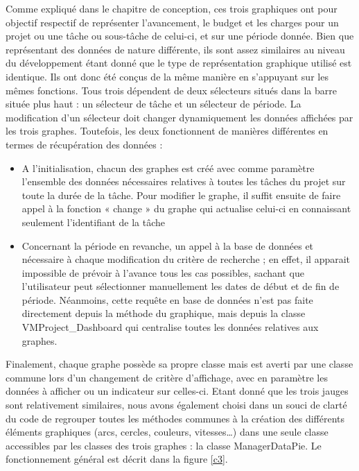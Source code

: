 \documentclass[12pt]{report}
\begin{document}
	Comme expliqué dans le chapitre de conception, ces trois graphiques ont pour objectif respectif de représenter l’avancement, le budget et les charges pour un projet ou une tâche ou sous-tâche de celui-ci, et sur une période donnée. Bien que représentant des données de nature différente, ils sont assez similaires au niveau du développement étant donné que le type de représentation graphique utilisé est identique. Ils ont donc été conçus de la même manière en s’appuyant sur les mêmes fonctions. Tous trois dépendent de deux sélecteurs situés dans la barre située plus haut : un sélecteur de tâche et un sélecteur de période. La modification d’un sélecteur doit changer dynamiquement les données affichées par les trois graphes. Toutefois, les deux fonctionnent de manières différentes en termes de récupération des données :\\
	
\begin{itemize} 
\item A l’initialisation, chacun des graphes est créé avec comme paramètre l’ensemble des données nécessaires relatives à toutes les tâches du projet sur toute la durée de la tâche. Pour modifier le graphe, il suffit ensuite de faire appel à la fonction « change » du graphe qui actualise celui-ci en connaissant seulement l’identifiant de la tâche
\item	Concernant la période en revanche, un appel à la base de données et nécessaire à chaque modification du critère de recherche ; en effet, il apparait impossible de prévoir à l’avance tous les cas possibles, sachant que l’utilisateur peut sélectionner manuellement les dates de début et de fin de période. Néanmoins, cette requête en base de données n’est pas faite directement depuis la méthode du graphique, mais depuis la classe VMProject\_Dashboard qui centralise toutes les données relatives aux graphes.\\
\end{itemize}
Finalement, chaque graphe possède sa propre classe mais est averti par une classe commune lors d’un changement de critère d’affichage, avec en paramètre les données à afficher ou un indicateur sur celles-ci. Etant donné que les trois jauges sont relativement similaires, nous avons également choisi dans un souci de clarté du code de regrouper toutes les méthodes communes à la création des différents éléments graphiques (arcs, cercles, couleurs, vitesses…) dans une seule classe accessibles par les classes des trois graphes : la classe ManagerDataPie. Le fonctionnement général est décrit dans la figure \ref{c3}.  
\end{document}
